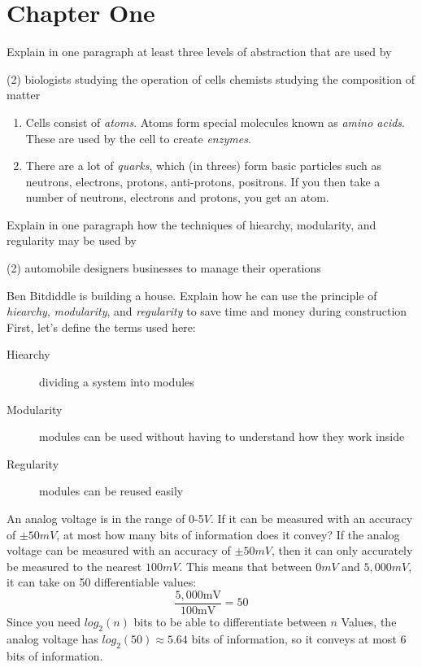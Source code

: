 \section{Chapter One}

\exercise %
Explain in one paragraph at least three levels
of abstraction that are used by
\begin{tasks}(2)
	\task biologists studying the operation of cells
	\task chemists studying the composition of matter	
\end{tasks}
\solution
\begin{enumerate}[label=\alph*)]
\item Cells consist of \emph{atoms}. Atoms form special molecules known as 
\emph{amino acids}. These are used by the cell to create \emph{enzymes}. 
\item There are a lot of \emph{quarks}, which (in threes) form basic particles
such as neutrons, electrons, protons, anti-protons, positrons. If you then
take a number of neutrons, electrons and protons, you get an atom.
\end{enumerate}

\exercise %
Explain in one paragraph how the techniques of hiearchy, modularity,
and regularity may be used by
\begin{tasks}(2)
	\task automobile designers
	\task businesses to manage their operations
\end{tasks}
\solution
{}

\exercise %
Ben Bitdiddle is building a house. Explain how he can use the principle
of \emph{hiearchy}, \emph{modularity}, and \emph{regularity} to save time 
and money during construction
\solution
First, let's define the terms used here:
\begin{description}
	\item[Hiearchy] dividing a system into modules
	\item[Modularity] modules can be used without having to understand
	how they work inside
	\item[Regularity] modules can be reused easily
\end{description}

\exercise
An analog voltage is in the range of 0-5$V$. If it can be measured with
an accuracy of $\pm 50mV$, at most how many bits of information does it convey?
\solution
If the analog voltage can be measured with an accuracy of $\pm 50mV$, then
it can only accurately be measured to the nearest $100mV$. This means that
between $0mV$ and $5,000mV$, it can take on 50 differentiable
values:
\begin{equation*}
\frac{5,000\mathrm{mV}}{100\mathrm{mV}}=50	
\end{equation*}
Since you need $log_2(n)$ bits to be able to differentiate between $n$
Values, the analog voltage has $log_2(50) \approx 5.64$ bits of information, 
so it conveys at most 6 bits of information.

